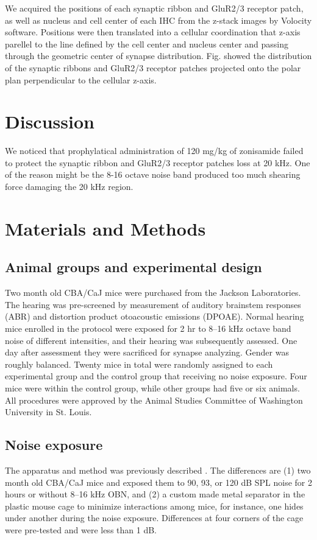 \documentclass[11pt]{article}
\begin{document}
We acquired the positions of each synaptic ribbon and GluR2/3 receptor patch, as well as nucleus and cell center of each IHC from the z-stack images by Volocity software. Positions were then translated into a cellular coordination that z-axis parellel to the line defined by the cell center and nucleus center and passing through the geometric center of synapse distribution. Fig. showed the distribution of the synaptic ribbons and GluR2/3 receptor patches projected onto the polar plan perpendicular to the cellular z-axis. 

\section {Discussion}
We noticed that prophylatical administration of 120 mg/kg of zonisamide failed to protect the synaptic ribbon and GluR2/3 receptor patches loss at 20 kHz. One of the reason might be the 8-16 octave noise band produced too much shearing force damaging the 20 kHz region. 
\section{Materials and Methods}

\subsection {Animal groups and experimental design}
Two month old CBA/CaJ mice were purchased from the Jackson Laboratories. The hearing was pre-screened by measurement of auditory brainstem responses (ABR) and distortion product otoacoustic emissions (DPOAE). Normal hearing mice enrolled in the protocol were exposed for 2 hr to 8--16 kHz octave band noise of different intensities, and their hearing was subsequently assessed. One day after assessment they were sacrificed for synapse analyzing. Gender was roughly balanced. Twenty mice in total were randomly assigned to each experimental group and the control group that receiving no noise exposure. Four mice were within the control group, while other groups had five or six animals. All procedures were approved by the Animal Studies Committee of Washington University in St. Louis.

\subsection {Noise exposure}
The apparatus and method was previously described \cite{Ohlemiller2011}. The differences are (1) two month old CBA/CaJ mice and exposed them to 90, 93, or 120 dB SPL noise for 2 hours or without 8--16 kHz OBN, and (2) a custom made metal separator in the plastic mouse cage to minimize interactions among mice, for instance, one hides under another during the noise exposure. Differences at four corners of the cage were pre-tested and were less than 1 dB.
\end{document}
